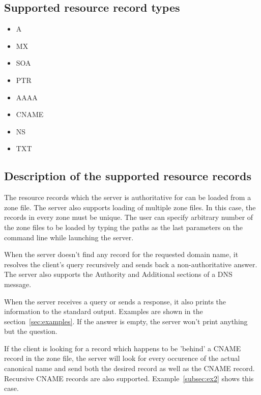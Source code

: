 \documentclass[12pt,a4paper,titlepage,final]{article}
\begin{document}
\subsection{Supported resource record types}
\begin{center}
	\begin{varwidth}[t]{.5\textwidth}
		\begin{itemize}
			\item A
			\item MX
			\item SOA
			\item PTR
		\end{itemize}
	\end{varwidth}
	\hspace{4em}
	\begin{varwidth}[t]{.5\textwidth}
		\begin{itemize}
			\item AAAA
			\item CNAME
			\item NS
			\item TXT
		\end{itemize}
	\end{varwidth}
\end{center}

\subsection{Description of the supported resource records}

The resource records which the server is authoritative for can be loaded from a zone file. The server also supports loading of multiple zone files. In this case, the records in every zone must be unique. The user can specify arbitrary number of the zone files to be loaded by typing the paths as the last parameters on the command line while launching the server.

When the server doesn't find any record for the requested domain name, it resolves the client's query recursively and sends back a non-authoritative answer. The server also supports the Authority and Additional sections of a DNS message.

When the server receives a query or sends a response, it also prints the information to the standard output. Examples are shown in the section~\ref{sec:examples}. If the answer is empty, the server won't print anything but the question.

If the client is looking for a record which happens to be 'behind' a CNAME record in the zone file, the server will look for every occurence of the actual canonical name and send both the desired record as well as the CNAME record. Recursive CNAME records are also supported. Example~\ref{subsec:ex2} shows this case.
\end{document}
